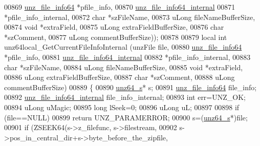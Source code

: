 \begin{DoxyCode}
00869                                                   \hyperlink{structunz__file__info64__s}{unz\_file\_info64} *pfile\_info,
00870                                                   \hyperlink{structunz__file__info64__internal__s}{unz\_file\_info64\_internal}
00871                                                   *pfile\_info\_internal,
00872                                                   \textcolor{keywordtype}{char} *szFileName,
00873                                                   uLong fileNameBufferSize,
00874                                                   \textcolor{keywordtype}{void} *extraField,
00875                                                   uLong extraFieldBufferSize,
00876                                                   \textcolor{keywordtype}{char} *szComment,
00877                                                   uLong commentBufferSize));
00878 
00879 local \textcolor{keywordtype}{int} unz64local\_GetCurrentFileInfoInternal (unzFile file,
00880                                                   \hyperlink{structunz__file__info64__s}{unz\_file\_info64} *pfile\_info,
00881                                                   \hyperlink{structunz__file__info64__internal__s}{unz\_file\_info64\_internal}
00882                                                   *pfile\_info\_internal,
00883                                                   \textcolor{keywordtype}{char} *szFileName,
00884                                                   uLong fileNameBufferSize,
00885                                                   \textcolor{keywordtype}{void} *extraField,
00886                                                   uLong extraFieldBufferSize,
00887                                                   \textcolor{keywordtype}{char} *szComment,
00888                                                   uLong commentBufferSize)
00889 \{
00890     \hyperlink{structunz64__s}{unz64\_s}* s;
00891     \hyperlink{structunz__file__info64__s}{unz\_file\_info64} file\_info;
00892     \hyperlink{structunz__file__info64__internal__s}{unz\_file\_info64\_internal} file\_info\_internal;
00893     \textcolor{keywordtype}{int} err=UNZ\_OK;
00894     uLong uMagic;
00895     \textcolor{keywordtype}{long} lSeek=0;
00896     uLong uL;
00897 
00898     \textcolor{keywordflow}{if} (file==NULL)
00899         \textcolor{keywordflow}{return} UNZ\_PARAMERROR;
00900     s=(\hyperlink{structunz64__s}{unz64\_s}*)file;
00901     \textcolor{keywordflow}{if} (ZSEEK64(s->z\_filefunc, s->filestream,
00902               s->pos\_in\_central\_dir+s->byte\_before\_the\_zipfile,

\end{DoxyCode}
